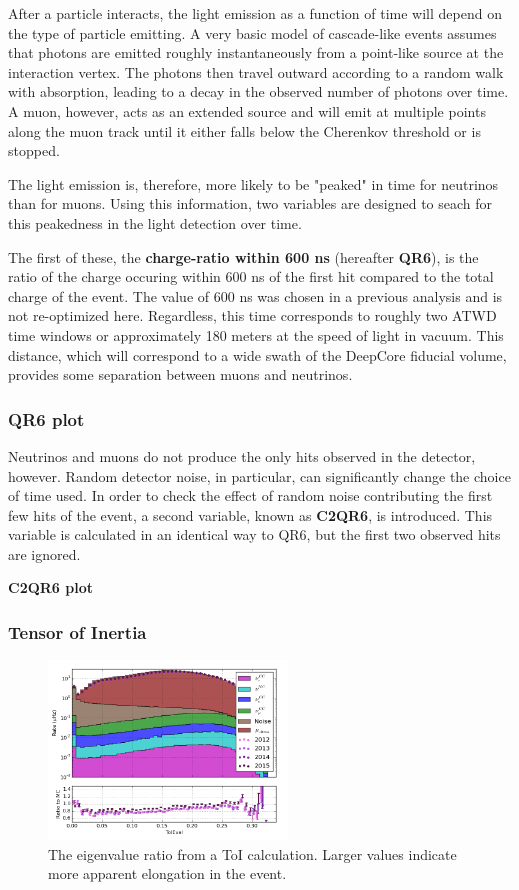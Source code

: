 After a particle interacts, the light emission as a function of time will depend on the type of particle emitting.
A very basic model of cascade-like events assumes that photons are emitted roughly instantaneously from a point-like source at the interaction vertex. 
The photons then travel outward according to a random walk with absorption, leading to a decay in the observed number of photons over time.
A muon, however, acts as an extended source and will emit at multiple points along the muon track until it either falls below the Cherenkov threshold or is stopped.

The light emission is, therefore, more likely to be "peaked" in time for neutrinos than for muons. 
Using this information, two variables are designed to seach for this peakedness in the light detection over time.

The first of these, the \textbf{charge-ratio within 600 ns} (hereafter \textbf{QR6}), is the ratio of the charge occuring within 600 ns of the first hit compared to the total charge of the event.
The value of 600 ns was chosen in a previous analysis and is not re-optimized here.
Regardless, this time corresponds to roughly two ATWD time windows or approximately 180 meters at the speed of light in vacuum.
This distance, which will correspond to a wide swath of the DeepCore fiducial volume, provides some separation between muons and neutrinos.

\subsubsection{QR6 plot}

Neutrinos and muons do not produce the only hits observed in the detector, however. 
Random detector noise, in particular, can significantly change the choice of time used.
In order to check the effect of random noise contributing the first few hits of the event, a second variable, known as \textbf{C2QR6}, is introduced.
This variable is calculated in an identical way to QR6, but the first two observed hits are ignored.

\textbf{C2QR6 plot}


\subsubsection{Tensor of Inertia}
\begin{figure}[h]
	\centering
		\includegraphics[width=2.5in]{ToIEval_log.png}
		\caption[Tensor-of-Inertia Eigenvalue Ratio]{The eigenvalue ratio from a ToI calculation. Larger values indicate more apparent elongation in the event.}
	\label{fig:toi_log}
\end{figure}

